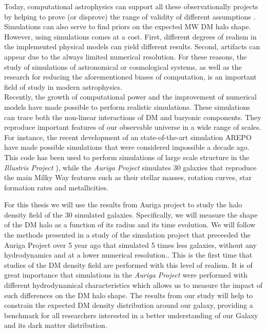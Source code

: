 \documentclass[12pt]{article}
\begin{document}
Today, computational astrophysics can support all these observationally projects by helping to prove (or disprove) the range of validity of different assumptions \cite{prove,bardeen,Vera-Ciro2011}.
Simulations can also serve to find priors on the expected MW DM halo shape.
However, using simulations comes at a cost.
First, different degrees of realism in the implemented physical models can yield different results.
Second, artifacts can appear due to the always limited numerical resolution. 
For these reasons, the study of simulations of astronomical or cosmological systems, as well as the research for reducing the aforementioned biases of computation, is an important field of study in modern astrophysics.\\

Recently, the growth of computational power and the improvement of numerical models have made possible to perform realistic simulations.
These simulations can trace both the non-linear interactions of DM and baryonic components. 
They reproduce important features of our observable universe in a wide range of scales.
For instance, the recent development of an state-of-the-art simulation AREPO \cite{arepo} have made possible simulations that were considered impossible a decade ago.
This code has been used to perform simulations of large scale structure in the \emph{Illustris Project} \cite{Illustris2}), while the 
\emph{Auriga Project} \cite{auriga} simulates 30 galaxies that reproduce the main Milky Way features such as their stellar masses, rotation curves, star formation rates and metallicities.

For this thesis we will use the results from Auriga project \cite{auriga} to study the halo density field of the 30 simulated galaxies.
Specifically, we will measure the shape of the DM halo as a function of its radius and its time evolution.
We will follow the methods presented in a study of the simulation project that preceeded the Auriga Project over 5 year ago \cite{Vera-Ciro2011} that simulated 5 times less galaxies, without any hydrodynamics and at a lower numerical resolution.. 
This is the first time that studies of the DM density field are performed with this level of realism.
It is of great importance that simulations in the \emph{Auriga Project} were performed with different hydrodynamical characteristics 
which allows us to measure the impact of such differences on the DM halo shape.
The results from our study will help to constrain the expected DM density distribution around our galaxy, 
providing a benchmark for all researchers interested in a better understanding of our Galaxy and its 
dark matter distribution.
\end{document}
